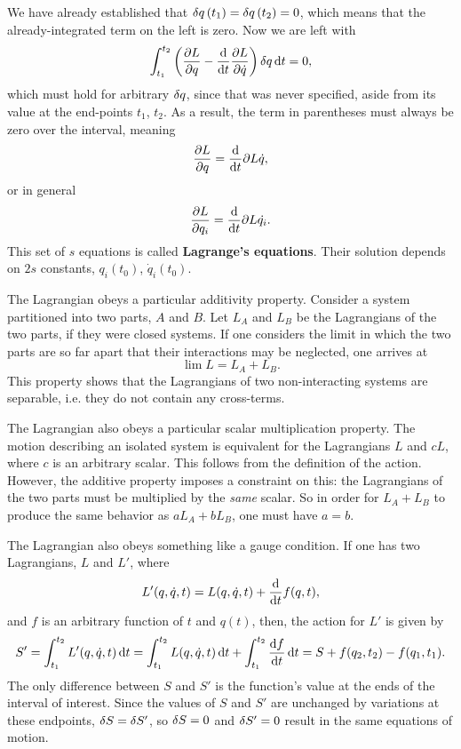 \documentclass{book}
\begin{document}
%
We have already established that $\var{q}(t_1) = \var{q}(t_2) = 0$, which means that the already-integrated term on the left is zero. Now we are left with
%
\begin{equation}
  \int_{t_1}^{t_2} \qty( \pdv{L}{q} - \dv{t} \pdv{L}{\dot{q}} ) \var{q} \dd{t} =
  0,
\end{equation}
%
which must hold for arbitrary $\var{q}$, since that was never specified, aside from its value at the end-points $t_1$, $t_2$. As a result, the term in parentheses must always be zero over the interval, meaning
%
\begin{equation}
  \pdv{L}{q} = \dv{t} \partial{L}{\dot{q}},
\end{equation}
%
or in general
%
\begin{equation}
  \pdv{L}{q_i} = \dv{t} \partial{L}{\dot{q_i}}.
\end{equation}
%
This set of $s$ equations is called \textbf{Lagrange's equations}. Their solution depends on $2s$ constants, $q_i(t_0)$, $\dot{q}_i(t_0)$.

The Lagrangian obeys a particular additivity property. Consider a system partitioned into two parts, $A$ and $B$. Let $L_A$ and $L_B$ be the Lagrangians of the two parts, if they were closed systems. If one considers the limit in which the two parts are so far apart that their interactions may be neglected, one arrives at
%
\begin{equation}
  \lim L = L_A + L_B.
\end{equation}
%
This property shows that the Lagrangians of two non-interacting systems are separable, i.e. they do not contain any cross-terms.

The Lagrangian also obeys a particular scalar multiplication property. The motion describing an isolated system is equivalent for the Lagrangians $L$ and $c L$, where $c$ is an arbitrary scalar. This follows from the definition of the action. However, the additive property imposes a constraint on this: the Lagrangians of the two parts must be multiplied by the \emph{same} scalar. So in order for $L_A + L_B$ to produce the same behavior as $a L_A + b L_B$, one must have $a = b$.

The Lagrangian also obeys something like a gauge condition. If one has two Lagrangians, $L$ and $L'$, where
%
\begin{equation}
  L'(q, \dot{q}, t) = L(q, \dot{q}, t) + \dv{t} f(q, t),
\end{equation}
%
and $f$ is an arbitrary function of $t$ and $q(t)$, then, the action for $L'$ is given by
%
\begin{equation}
  S' =
  \int_{t_1}^{t_2} L'(q, \dot{q}, t) \dd{t} =
  \int_{t_1}^{t_2} L(q, \dot{q}, t) \dd{t} + \int_{t_1}^{t_2} \dv{f}{t} \dd{t} =
  S + f(q_2, t_2) - f(q_1, t_1).
\end{equation}
%
The only difference between $S$ and $S'$ is the function's value at the ends of the interval of interest. Since the values of $S$ and $S'$ are unchanged by variations at these endpoints, $\var{S} = \var{S'}$, so $\var{S} = 0$ and $\var{S'} = 0$ result in the same equations of motion.
\end{document}
